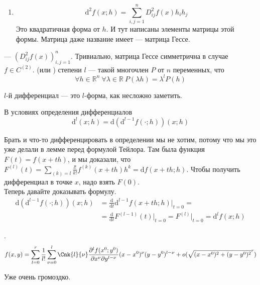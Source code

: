 \documentclass{article}
\begin{document}
\begin{itemize}
\begin{Comment}
\begin{enumerate}
                \item
                $$
                \mathrm d^2f(x;h)=\sum\limits_{i,j=1}^nD^2_{ij}f(x)h_ih_j
                $$
                Это квадратичная форма от $h$. И тут написаны элементы матрицы этой формы. Матрица даже название имеет --- матрица Гессе.
            \end{enumerate}
        \end{Comment}
        \dfn {} --- $(D^2_{ij}f(x))_{i,j=1}^n$.
        \thm Тривиально, матрица Гессе симметрична в случае $f\in C^{(2)}$.
        \dfn {} (или ) степени $l$ --- такой многочлен $P$ от $n$ переменных, что
        $$\forall h\in\mathbb R^n~\forall\lambda\in\mathbb R~P(\lambda h)=\lambda^lP(h)$$
        \begin{Comment}
            $l$-й дифференциал --- это $l$-форма, как несложно заметить.
        \end{Comment}
        \thm В условиях определения дифференциалов
        $$
        \mathrm d^l(x;h)=\mathrm d\left(\mathrm d^{l-1}f(\cdot;h)\right)(x;h)
        $$
        \begin{Proof}
            Брать и что-то дифференцировать в определении мы не хотим, потому что мы это уже делали в лемме перед формулой Тейлора. Там была функция $F(t)=f(x+th)$, и мы доказали, что $F^{(l)}(t)=\sum\limits_{(k)=l}\frac{l!}{k!}f^{(k)}(x+th)h^k=\mathrm df(x+th;h)$. Чтобы получить дифференциал в точке $x$, надо взять $F(0)$.\\
            Теперь давайте доказывать формулу.
            \[
            \begin{split}
                \mathrm d\left(\mathrm d^{l-1}f(\cdot;h)\right)(x;h)&=\frac{\mathrm d}{\mathrm dt}\mathrm d^{l-1}f(x+th;h)\bigg|_{t=0}=\\
                &=\frac{\mathrm d}{\mathrm dt}F^{(l-1)}(t)\bigg|_{t=0}=F^{(l)}\bigg|_{t=0}=\mathrm d^lf(x;h)
            \end{split}
            \]
        \end{Proof}
        \thm {}.
        $$
        f(x,y)=\sum\limits_{l=0}^r\frac1{l!}\sum\limits_{\nu=0}^l\Cnk{l}{\nu}\frac{\partial^lf(x^0;y^0)}{\partial x^\nu\partial y^{l-\nu}}(x-x^0)^\nu(y-y^0)^{l-\nu}+o(\sqrt{(x-x^0)^2+(y-y^0)^2}^r)
        $$
        \begin{Comment}
            Уже очень громоздко.
        \end{Comment}

\end{itemize}
\end{document}

